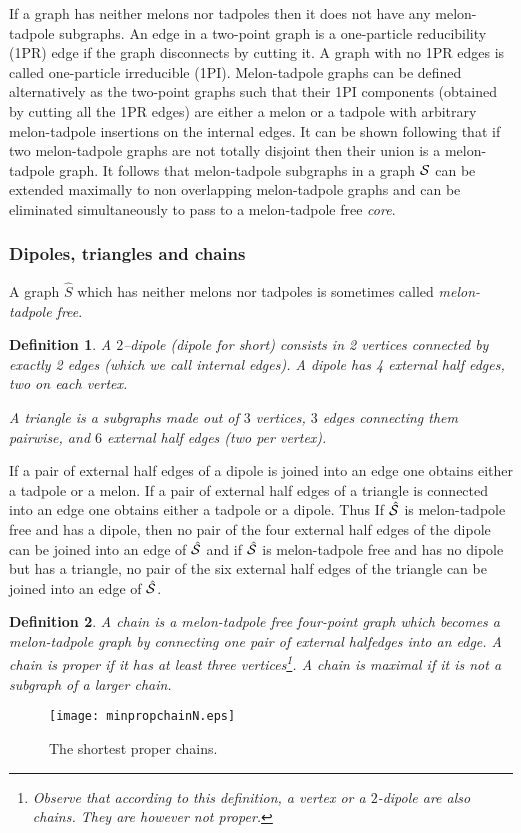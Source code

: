 \documentclass[10pt]{article}
\theoremstyle{plain}
\newtheorem{definition}{Definition}
\theoremstyle{definition}
\newcommand{\cS}{{\cal S}}
\begin{document}
If a graph has neither melons nor tadpoles then it does not have any melon-tadpole subgraphs.
An edge in a two-point graph is a one-particle reducibility (1PR) edge if the graph disconnects by cutting it. A graph with no 1PR edges is called one-particle irreducible (1PI).
Melon-tadpole graphs can be defined alternatively as the two-point graphs such that their 1PI components (obtained by cutting all the 1PR edges)
are either a melon or a tadpole with arbitrary melon-tadpole insertions on the internal edges. 
It can be shown following \cite{GurSch} that if two melon-tadpole graphs are not totally disjoint then their union is a melon-tadpole graph.
It follows that melon-tadpole subgraphs in a graph $\cS$ can be extended maximally to non overlapping melon-tadpole graphs and can be eliminated simultaneously 
to pass to a melon-tadpole free \emph{core}.

\subsubsection{Dipoles, triangles and chains} 

A graph $\hat S$ which has neither melons nor tadpoles is sometimes called \emph{melon-tadpole free}.

\begin{definition}\label{def:dipole}
A $2$--\emph{dipole} (dipole for short) consists in 2 vertices connected by exactly 2 edges (which we call internal edges).  
A dipole has 4 external half edges, two on each vertex.

A \emph{triangle} is a subgraphs made out of $3$ vertices, $3$ edges connecting them pairwise, and $6$ external half edges (two per vertex). 
\end{definition}

If a pair of external half edges of a dipole is joined into an edge one obtains either a tadpole or a melon. If a pair of external half edges of a
triangle is connected into an edge one obtains either a tadpole or a dipole. Thus 
 If $\hat \cS$ is melon-tadpole free and has a dipole, then no pair of the four external half edges of the dipole can be joined into an edge of $\hat \cS$
 and if $\hat \cS$ is melon-tadpole free and has no dipole but has a triangle, no pair of the six external half edges of the triangle can be joined into an edge of $\hat \cS$.


\begin{definition}
   A \emph{chain} is a melon-tadpole free four-point graph which becomes a melon-tadpole graph by connecting one pair of external halfedges into an edge.
   A chain is \emph{proper} if it has at least three vertices\footnote{Observe that according to this definition, a vertex or a $2$-dipole are also chains. They are however not proper.}. A chain is maximal if it is not a subgraph of a larger chain. 
\end{definition}
\begin{figure}[htb]
 \begin{center}
 \texttt{[image: minpropchainN.eps]}  
 \caption{The shortest proper chains.}\label{fig:minpropchain}
 \end{center}
 \end{figure}  
\end{document}
